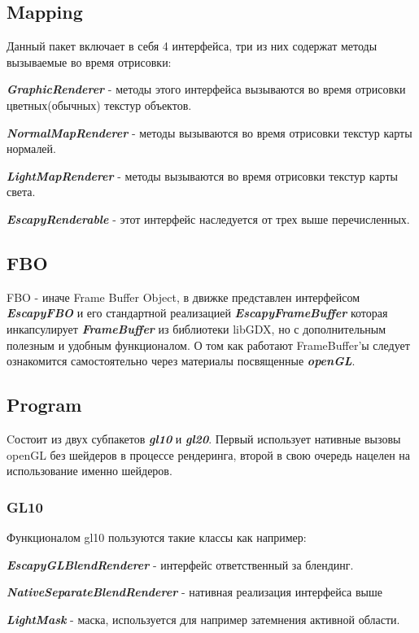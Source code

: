 \documentclass[11pt]{report}
\newenvironment{itemize*}%
  {\begin{itemize}%
    \setlength{\itemsep}{2pt}%
    \setlength{\parskip}{0.75pt}}%
  {\end{itemize}}
\begin{document}
\subsection{Mapping}
Данный пакет включает в себя 4 интерфейса, три из них содержат методы вызываемые во время отрисовки: \begin{itemize*}
	\item \textit{\textbf{GraphicRenderer}} - методы этого интерфейса вызываются во время 		отрисовки цветных(обычных) текстур объектов.
	\item \textit{\textbf{NormalMapRenderer}} - методы вызываются во время отрисовки 			текстур карты нормалей.
	\item \textit{\textbf{LightMapRenderer}} - методы вызываются во время отрисовки 			текстур карты света.
	\item \textit{\textbf{EscapyRenderable}} - этот интерфейс наследуется от трех выше 			перечисленных.
\end{itemize*}

\subsection{FBO}
FBO - иначе Frame Buffer Object, в движке представлен интерфейсом \textit{\textbf{EscapyFBO}} и его стандартной реализацией \textit{\textbf{EscapyFrameBuffer}} которая инкапсулирует \textit{\textbf{FrameBuffer}} из библиотеки libGDX, но с дополнительным полезным и удобным функционалом. О том как работают FrameBuffer'ы следует ознакомится самостоятельно через материалы посвященные \textit{\textbf{openGL}}.\\
\subsection{Program}
Cостоит из двух субпакетов \textit{\textbf{gl10}} и \textit{\textbf{gl20}}.
Первый использует нативные вызовы openGL без шейдеров в процессе рендеринга, второй в свою очередь нацелен на использование именно шейдеров.
\subsubsection{GL10} 
Функционалом gl10 пользуются такие классы как например: \begin{itemize*}
	\item \textit{\textbf{EscapyGLBlendRenderer}} - интерфейс ответственный за блендинг.
	\item \textit{\textbf{NativeSeparateBlendRenderer}} - нативная реализация интерфейса 		выше
	\item \textit{\textbf{LightMask}} - маска, используется для например затемнения 			активной области.
\end{itemize*}
\end{document}
